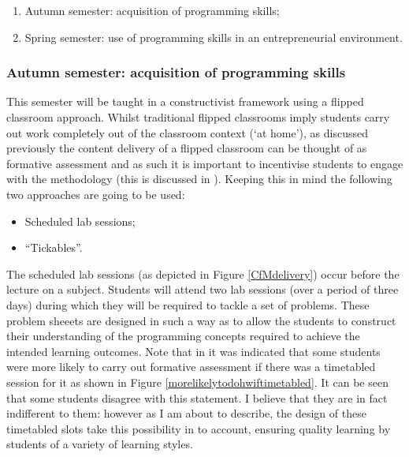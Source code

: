 \documentclass{article}
\begin{document}
\begin{enumerate}
    \item Autumn semester: acquisition of programming skills;
    \item Spring semester: use of programming skills in an entrepreneurial environment.
\end{enumerate}

\subsubsection{Autumn semester: acquisition of programming skills}

This semester will be taught in a constructivist framework \cite{jordan_approaches_2008} using a flipped classroom approach. Whilst traditional flipped classrooms imply students carry out work completely out of the classroom context (`at home'), as discussed previously the content delivery of a flipped classroom can be thought of as formative assessment and as such it is important to incentivise students to engage with the methodology (this is discussed in \cite{anderson_understanding_2013}). Keeping this in mind the following two approaches are going to be used:

\begin{itemize}
    \item Scheduled lab sessions;
    \item ``Tickables''.
\end{itemize}

The scheduled lab sessions (as depicted in Figure \ref{CfMdelivery}) occur before the lecture on a subject. Students will attend two lab sessions (over a period of three days) during which they will be required to tackle a set of problems. These problem sheeets are designed in such a way as to allow the students to construct their understanding of the programming concepts required to achieve the intended learning outcomes. Note that in \cite{anderson_understanding_2013} it was indicated that some students were more likely to  carry out formative assessment if there was a timetabled session for it as shown in Figure \ref{morelikelytodohwiftimetabled}. It can be seen that some students disagree with this statement. I believe that they are in fact indifferent to them: however as I am about to describe, the design of these timetabled slots take this possibility in to account, ensuring quality learning by students of a variety of learning styles.
\end{document}
